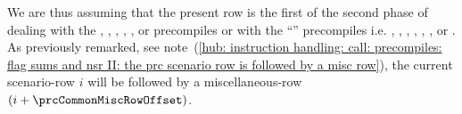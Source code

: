 \begin{center}
\end{center}
We are thus assuming that the present row is the first of the second phase of dealing with the 
,
,
,
,
,
 or
precompiles or with the ``\blsMod{}'' precompiles i.e.
,
,
,
,
,
,
 or
.
As previously remarked,
see note~(\ref{hub: instruction handling: call: precompiles: flag sums and nsr II: the prc scenario row is followed by a misc row}),
the current scenario-row $i$ will be followed by a miscellaneous-row $(i + \prcCommonMiscRowOffset)$.
